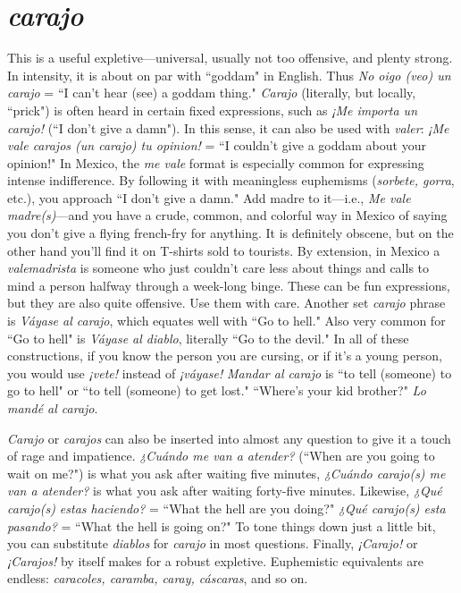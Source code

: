 \section{\emph{carajo}}

This is a useful expletive---universal, usually not too offensive, and plenty strong. In intensity, it is about on par with ``goddam"
in English. Thus \emph{No oigo (veo) un carajo} = ``I can't hear (see) a goddam thing." \emph{Carajo} (literally, but locally, ``prick") is often heard in certain fixed expressions, such as \emph{¡Me importa un carajo!} (``I don't give a
damn"). In this sense, it can also be used with \emph{valer}: \emph{¡Me vale carajos
	(un carajo) tu opinion!} = ``I couldn't give a goddam about your
opinion!"
In Mexico, the \emph{me vale} format is especially common for expressing intense indifference. By following it with meaningless euphemisms (\emph{sorbete, gorra}, etc.), you approach ``I don't give a damn." Add
madre to it---i.e., \emph{Me vale madre(s)}---and you have a crude, common,
and colorful way in Mexico of saying you don't give a flying french-fry
for anything. It is definitely obscene, but on the other hand you'll find
it on T-shirts sold to tourists. By extension, in Mexico a \emph{valemadrista}
is someone who just couldn't care less about things and calls to mind
a person halfway through a week-long binge. These can be fun expressions, but they are also quite offensive. Use them with care.
Another set \emph{carajo} phrase is \emph{Váyase al carajo}, which equates
well with ``Go to hell." Also very common for ``Go to hell" is \emph{Váyase
	al diablo}, literally ``Go to the devil." In all of these constructions, if
you know the person you are cursing, or if it's a young person, you
would use \emph{¡vete!} instead of \emph{¡váyase!} \emph{Mandar al carajo} is ``to tell (someone) to go to hell" or ``to tell (someone) to get lost." ``Where's your kid
brother?" \emph{Lo mandé al carajo}.

\emph{Carajo} or \emph{carajos} can also be inserted into almost any
question to give it a touch of rage and impatience. \emph{¿Cuándo me van a atender?} (``When are you going to wait on me?") is what you ask after waiting five minutes, \emph{¿Cuándo carajo(s) me van a atender?} is what you ask
after waiting forty-five minutes. Likewise, \emph{¿Qué carajo(s) estas haciendo?} = ``What the hell are you doing?" \emph{¿Qué carajo(s) esta pasando?}
= ``What the hell is going on?" To tone things down just a little bit,
you can substitute \emph{diablos} for \emph{carajo} in most questions.
Finally, \emph{¡Carajo!} or \emph{¡Carajos!} by itself makes for a robust expletive. Euphemistic equivalents are endless: \emph{caracoles, caramba,
	caray, cáscaras}, and so on.

